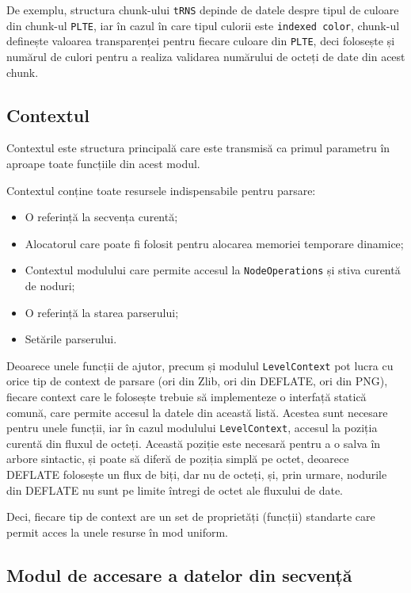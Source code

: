 \documentclass[a4paper,12pt]{report}
\begin{document}
De exemplu, structura chunk-ului \texttt{tRNS} depinde de datele despre
tipul de culoare din chunk-ul \texttt{PLTE}, iar în cazul în care tipul culorii este \texttt{indexed color},
chunk-ul definește valoarea transparenței pentru fiecare culoare din \texttt{PLTE},
deci folosește și numărul de culori pentru a realiza validarea numărului de octeți de date din acest chunk.

\subsection{Contextul}

Contextul este structura principală care este transmisă ca primul parametru
în aproape toate funcțiile din acest modul.

Contextul conține toate resursele indispensabile pentru parsare:
\begin{itemize}
    \item O referință la secvența curentă;
    \item Alocatorul care poate fi folosit pentru alocarea memoriei temporare dinamice;
    \item Contextul modulului care permite accesul la \texttt{NodeOperations} și stiva curentă de noduri;
    \item O referință la starea parserului;
    \item Setările parserului.
\end{itemize}

Deoarece unele funcții de ajutor, precum și modulul \texttt{LevelContext}
pot lucra cu orice tip de context de parsare (ori din Zlib, ori din DEFLATE, ori din \ac{PNG}),
fiecare context care le folosește trebuie să implementeze o interfață statică comună,
care permite accesul la datele din această listă.
Acestea sunt necesare pentru unele funcții,
iar în cazul modulului \texttt{LevelContext},
accesul la poziția curentă din fluxul de octeți.
Această poziție este necesară pentru a o salva în arbore sintactic,
și poate să diferă de poziția simplă pe octet,
deoarece DEFLATE folosește un flux de biți, dar nu de octeți,
și, prin urmare, nodurile din DEFLATE nu sunt pe limite întregi de octet ale fluxului de date.

Deci, fiecare tip de context are un set de proprietăți (funcții) standarte
care permit acces la unele resurse în mod uniform.


\subsection{Modul de accesare a datelor din secvență}
\end{document}
